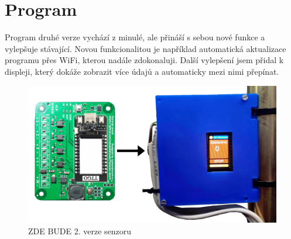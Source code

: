 \section{Program}
Program druhé verze vychází z minulé, ale přináší s sebou nové funkce a vylepšuje stávající.
Novou funkcionalitou je například automatická aktualizace programu přes WiFi, kterou nadále zdokonaluji.
Další vylepšení jsem přidal k displeji, který dokáže zobrazit více údajů a automaticky mezi nimi přepínat.

\begin{figure}[htbp]
    \centering
    \includegraphics[width=\textwidth]{img/SenzorV1.png}
    \caption{ZDE BUDE 2. verze senzoru}
    \label{fig:SenzorNaStroji}
\end{figure}


\newpage